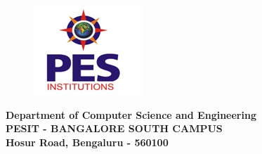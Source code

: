 \begin{center}
	\begin{figure}[h]
		\centering
		\includegraphics[scale = 1]{project/images/pesitbsc_logo}
		\label{fig:pesitbsclogo}
	\end{figure}
	\Large{\textbf{Department of Computer Science and Engineering}}\\
	\Large{\textbf{PESIT - BANGALORE SOUTH CAMPUS}}
	\large{\textbf{\\Hosur Road, Bengaluru - 560100}}\\
	\newpage
\end{center}